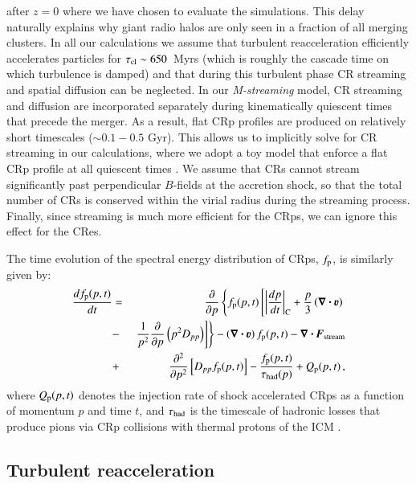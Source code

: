 \documentclass[a4paper,fleqn,usenatbib]{mnras}
\newcommand{\bcdot}{\ensuremath{%
  \mathchoice%
   {\mskip\thinmuskip\lower0.2ex\hbox{\scalebox{1.5}{$\cdot$}}\mskip\thinmuskip}}%
   {\mskip\thinmuskip\lower0.2ex\hbox{\scalebox{1.5}{$\cdot$}}\mskip\thinmuskip}%
   {\lower0.3ex\hbox{\scalebox{1.2}{$\cdot$}}}%
   {\lower0.3ex\hbox{\scalebox{1.2}{$\cdot$}}}%
}
\newcommand{\Mstream}{{\it M-streaming}\xspace}
\renewcommand{\vec}{\ensuremath{\mathbfit}}
\newcommand{\bvel}{\ensuremath{\boldsymbol{\varv}}}
\newcommand{\bnabla}{\ensuremath{\boldsymbol{\nabla}}}
\begin{document}
after $z=0$ where we have chosen to evaluate the simulations. This
delay naturally explains why giant radio halos are only seen in a
fraction of all merging clusters. In all our calculations we assume
that turbulent reacceleration efficiently accelerates particles for
$\tau_{\mathrm{cl}}\sim650$~Myrs (which is roughly the cascade time on which
turbulence is damped) and that during this turbulent phase CR
streaming and spatial diffusion can be neglected. In our \Mstream
model, CR streaming and diffusion are incorporated separately during
kinematically quiescent times that precede the merger. As a result,
flat CRp profiles are produced on relatively short timescales ($\sim
0.1-0.5$ Gyr). This allows us to implicitly solve for CR streaming in
our calculations, where we adopt a toy model that enforce a flat CRp
profile at all quiescent times \citep{wiener13}. We assume that CRs
cannot stream significantly past perpendicular $B$-fields at the
accretion shock, so that the total number of CRs is conserved within
the virial radius during the streaming process. Finally, since
streaming is much more efficient for the CRps, we can ignore this
effect for the CRes.

The time evolution of the spectral energy distribution of CRps,
$f_{{\mathrm{p}}}$, is similarly given by:
\begin{eqnarray}
{{d f_{\rmn{p}}(p,t)}\over{d t}} &=&
{{\partial }\over{\partial p}}
\left\{
f_{\rmn{p}}(p,t)\left[ \left|{{dp}\over{dt}}\right|_{\rm C}
+ \frac{p}{3}\left(\bnabla\bcdot \bvel\right)\right.\right.
\nonumber\\
&-&\left.\left. {1\over{p^2}}{{\partial }\over{\partial p}}\left(p^2 D_{pp}\right)
\right]\right\} - \left(\bnabla\bcdot \bvel\right) f_{\rmn{p}}(p,t)
- \bnabla\bcdot \vec{F}_\rmn{stream}
\nonumber\\
&+& {{\partial^2 }\over{\partial p^2}}
\left[ D_{pp} f_{\rmn{p}}(p,t) \right] - {{f_{\rmn{p}}(p,t)}\over{\tau_{\rm had}(p)}}
+ Q_{\rmn{p}}(p,t)\, ,
\label{eq:FP_p}
\end{eqnarray}
where $Q_{{\mathrm{p}}}(p,t)$ denotes the injection rate of shock
accelerated CRps as a function of momentum $p$ and time $t$, and
$\tau_{\rm had}$ is the timescale of hadronic losses that produce
pions via CRp collisions with thermal protons of the ICM
\cite[e.g.][]{brunetti11}.  


\subsection{Turbulent reacceleration}
\end{document}
